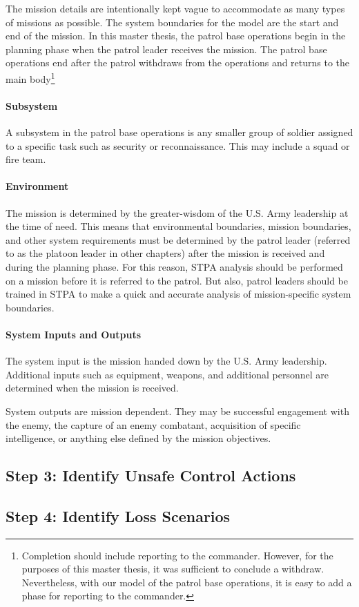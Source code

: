 \documentclass[../../main/main.tex]{subfiles}
\begin{document}
The mission details are intentionally kept vague to accommodate as many types of missions as possible.  The system boundaries for the model are the start and end of the mission. In this master thesis, the patrol base operations begin in the planning phase when the patrol leader receives the mission.  The patrol base operations end after the patrol withdraws from the operations and returns to the main body\footnote{Completion should include reporting to the commander.  However, for the purposes of this master thesis, it was sufficient to conclude a withdraw.  Nevertheless, with our model of the patrol base operations, it is easy to add a phase for reporting to the commander.}

\paragraph*{Subsystem}
A subsystem in the patrol base operations is any smaller group of soldier assigned to a specific task such as security or reconnaissance.  This may include a squad or fire team.  

\paragraph*{Environment}
The mission is determined by the greater-wisdom of the U.S. Army leadership at the time of need.  This means that environmental boundaries, mission boundaries, and other system requirements must be determined by the patrol leader  (referred to as the platoon leader in other chapters) after the mission is received and during the planning phase.  For this reason, STPA analysis should be performed on a mission before it is referred to the patrol.  But also, patrol leaders should be trained in STPA to make a quick and accurate analysis of mission-specific system boundaries.  


\paragraph*{System Inputs and Outputs}
The system input is the mission handed down by the U.S. Army leadership.  Additional inputs such as equipment, weapons, and additional personnel are determined when the mission is received. 

System outputs are mission dependent.  They may be successful engagement with the enemy, the capture of an enemy combatant, acquisition of specific intelligence, or anything else defined by the mission objectives.




\subsection{Step 3: Identify Unsafe Control Actions}
\subsection{Step 4: Identify Loss Scenarios}
\end{document}
